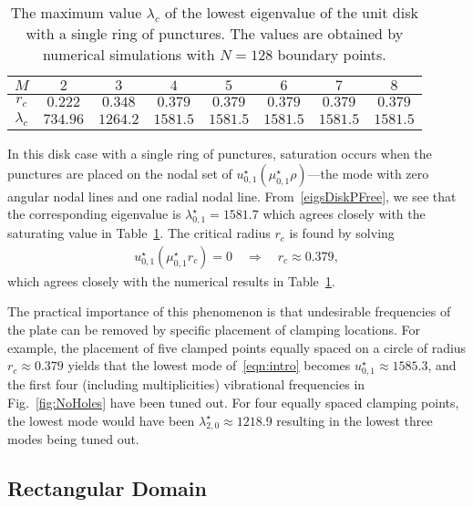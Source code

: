 \documentclass[times]{article}
\begin{document}
\begin{table}[htbp]
\centering
\begin{tabular}{|c|ccccccc|}
\hline
$M$ & $2$ & $3$ & $4$ & $5$ & $6$ & $7$ & $8$\\
\hline
$r_c$ & $0.222$ & $0.348$ &  $0.379$&  $0.379$&  $0.379$&  $0.379$&  $0.379$\\
\hline
$\lambda_c$ & $734.96$ & $1264.2$ & $1581.5$ & $1581.5$ & $1581.5$ & $1581.5$ & $1581.5$\\
\hline
\end{tabular}
\parbox{0.75\textwidth}{ \caption{The maximum value $\lambda_c$ of the
lowest eigenvalue of the unit disk with a single ring of punctures.  The
values are obtained by numerical simulations with $N=128$ boundary
points.  \label{tab:SingleRing}} }
\end{table}

In this disk case with a single ring of punctures, saturation occurs
when the punctures are placed on the nodal set of
$u^{\star}_{0,1}(\mu^{\star}_{0,1} \rho)$---the mode with zero angular
nodal lines and one radial nodal line. From~\eqref{eigsDiskPFree}, we
see that the corresponding eigenvalue is $\lambda_{0,1}^{\star} =1581.7$
which agrees closely with the saturating value in Table~\ref{tab:SingleRing}.
The critical radius $r_c$ is found by solving
\begin{align*}
  u^{\star}_{0,1}(\mu^{\star}_{0,1} r_c) = 0 \quad 
    \Longrightarrow \quad r_c \approx 0.379,
\end{align*}
which agrees closely with the numerical results in
Table~\ref{tab:SingleRing}. 

%
The practical importance of this phenomenon is that undesirable
frequencies of the plate can be removed by specific placement of
clamping locations. For example, the placement of five clamped points
equally spaced on a circle of radius $r_c \approx 0.379$ yields that
the lowest mode of~\eqref{eqn:intro} becomes $u^{\star}_{0,1} \approx
1585.3$, and the first four (including multiplicities) vibrational
frequencies in Fig.~\ref{fig:NoHoles} have been tuned out. For four
equally spaced clamping points, the lowest mode would have been
$\lambda^{\star}_{2,0} \approx1218.9$ resulting in the lowest three
modes being tuned out.


\subsection{Rectangular Domain}\label{sec:rectangle}
\end{document}
